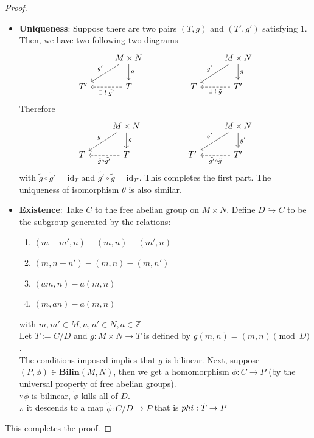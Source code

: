 \documentclass[oneside, 12pt]{scrbook}
\newcommand{\ZZ}{\mathbb Z}
\theoremstyle{theorem}
\begin{document}
\begin{proof}
\begin{itemize}
\item \textbf{Uniqueness}: Suppose there are two pairs $(T,g)$ and $(T',g')$ satisfying $1$. Then, we have two following two diagrams 
\[\begin{tikzcd}
	& {M\times N} &&& {M\times N} \\
	{T'} & T && T & {T'}
	\arrow["g", from=1-2, to=2-2]
	\arrow["{g'}"', from=1-2, to=2-1]
	\arrow["{\exists \;!\; \tilde{g'}}", dashed, from=2-2, to=2-1]
	\arrow["{g}", from=1-5, to=2-5]
	\arrow["{g'}"', from=1-5, to=2-4]
	\arrow["{\exists \;!\;\tilde{g}}", dashed, from=2-5, to=2-4]
\end{tikzcd}\]
Therefore
\[\begin{tikzcd}
	& {M\times N} &&& {M\times N} \\
	T & T && {T'} & {T'}
	\arrow["g", from=1-2, to=2-2]
	\arrow["g"', from=1-2, to=2-1]
	\arrow["{\tilde{g}\circ \tilde{g'}}", dashed, from=2-2, to=2-1]
	\arrow["{g'}", from=1-5, to=2-5]
	\arrow["{g'}"', from=1-5, to=2-4]
	\arrow["{\tilde{g'} \circ \tilde{g}}", dashed, from=2-5, to=2-4]
\end{tikzcd}\]
with $\tilde{g} \circ \tilde{g'} = \mathrm{id}_{T}$ and $\tilde{g'} \circ \tilde{g} = \mathrm{id}_{T'}$. This completes the first part. The uniqueness of isomorphism $\theta$ is also similar.

\item \textbf{Existence}: Take $C$ to the free abelian group on $M \times N$. Define $D \hookrightarrow C$ to be the subgroup generated by the relations:
\begin{enumerate}
\item $(m + m' , n) - (m,n) - (m',n) $
\item $(m, n+ n') - (m,n) - (m,n')$
\item $(am,n) - a(m,n)$
\item $(m,an) - a(m,n)$
\end{enumerate}
with $m,m' \in M , n,n' \in N , a\in \ZZ$ \\
Let $T := C/D$ and $g: M \times N \rightarrow T$ is defined by $g(m,n) = (m,n) \pmod{D}$. \\
The conditions imposed implies that $g$ is bilinear. Next, suppose $(P, \phi) \in \mathbf{Bilin}(M,N)$, then we get a homomorphism $\tilde{\phi} : C \rightarrow P$ (by the universal property of free abelian groups). \\
$\because \phi$ is bilinear, $\tilde{\phi}$ kills all of $D$. \\
$\therefore$ it descends to a map $\tilde{\phi} : C/D \rightarrow P$ that is $\tilde{\\phi : T \rightarrow P}$ 
\end{itemize}
This completes the proof.
\end{proof}
\end{document}
